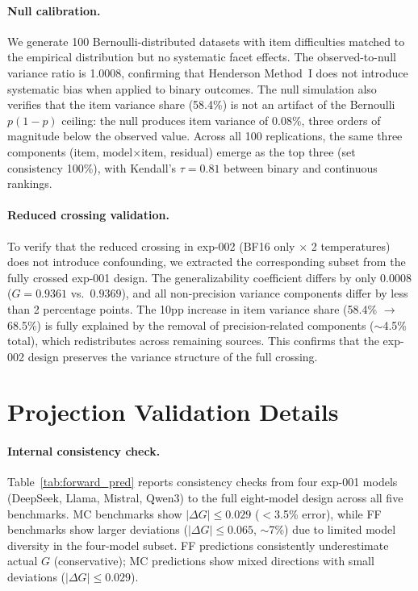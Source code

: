\paragraph{Null calibration.} We generate 100 Bernoulli-distributed datasets with item difficulties matched to the empirical distribution but no systematic facet effects. The observed-to-null variance ratio is 1.0008, confirming that Henderson Method~I does not introduce systematic bias when applied to binary outcomes. The null simulation also verifies that the item variance share (58.4\%) is not an artifact of the Bernoulli $p(1{-}p)$ ceiling: the null produces item variance of 0.08\%, three orders of magnitude below the observed value. Across all 100 replications, the same three components (item, model$\times$item, residual) emerge as the top three (set consistency 100\%), with Kendall's $\tau = 0.81$ between binary and continuous rankings.

\paragraph{Reduced crossing validation.} To verify that the reduced crossing in exp-002 (BF16 only $\times$ 2 temperatures) does not introduce confounding, we extracted the corresponding subset from the fully crossed exp-001 design. The generalizability coefficient differs by only 0.0008 ($G = 0.9361$ vs.\ $0.9369$), and all non-precision variance components differ by less than 2 percentage points. The 10pp increase in item variance share (58.4\% $\to$ 68.5\%) is fully explained by the removal of precision-related components ($\sim$4.5\% total), which redistributes across remaining sources. This confirms that the exp-002 design preserves the variance structure of the full crossing.

\section{Projection Validation Details}
\label{app:dstudy_cross}

\paragraph{Internal consistency check.} Table~\ref{tab:forward_pred} reports consistency checks from four exp-001 models (DeepSeek, Llama, Mistral, Qwen3) to the full eight-model design across all five benchmarks. MC benchmarks show $|\Delta G| \leq 0.029$ ($<$3.5\% error), while FF benchmarks show larger deviations ($|\Delta G| \leq 0.065$, $\sim$7\%) due to limited model diversity in the four-model subset. FF predictions consistently underestimate actual $G$ (conservative); MC predictions show mixed directions with small deviations ($|\Delta G| \leq 0.029$).

